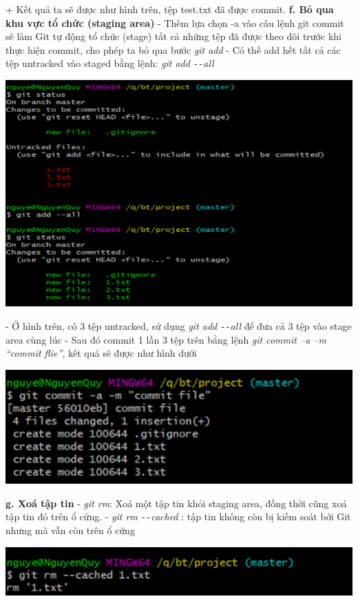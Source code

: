 \documentclass[12pt,a4paper]{report}
\begin{document}
	\label{fig:screenshot012}
\vskip 0.4cm\vskip 0.4cm
+ Kết quả ta sẽ được như hình trên, tệp test.txt đã được commit.\vskip 0.4cm
{\bf f. Bỏ qua khu vực tổ chức (staging area)}\vskip 0.4cm
- Thêm lựa chọn -a vào câu lệnh git commit sẽ làm Git tự động tổ chức (stage) tất cả những tệp đã được theo dõi trước khi thực hiện commit, cho phép ta bỏ qua bước \textit{git add}\vskip 0.4cm
- Có thế add hết tất cả các tệp untracked vào staged bằng lệnh: {\it git add \texttt{-{}-}all}\vskip 0.4cm

	\includegraphics[width=0.8\linewidth]{screenshot013}

	\label{fig:screenshot013}
\vskip 0.4cm\vskip 0.4cm
- Ở hình trên, có 3 tệp untracked, sử dụng {\it git add \texttt{-{}-}all} để đưa cả 3 tệp vào stage area cùng lúc\vskip 0.4cm
- Sau đó commit 1 lần 3 tệp trên bằng lệnh {\it git commit –a –m “commit flie”}, kết quả sẽ được như hình dưới\vskip 0.4cm

	\includegraphics[width=0.8\linewidth]{screenshot014}

	\label{fig:screenshot014}\vskip 0.4cm\vskip 0.4cm

{\bf g. Xoá tập tin} \vskip 0.4cm
- {\it git rm}: Xoá một tập tin khỏi staging area, đồng thời cũng xoá tập tin đó trên ổ cứng.\vskip 0.4cm
- {\it git rm \texttt{-{}-}cached} : tập tin không còn bị kiếm soát bởi Git nhưng mà vẫn còn trên ổ cứng\vskip 0.4cm


	\includegraphics[width=0.8\linewidth]{screenshot015}
	
\end{document}
